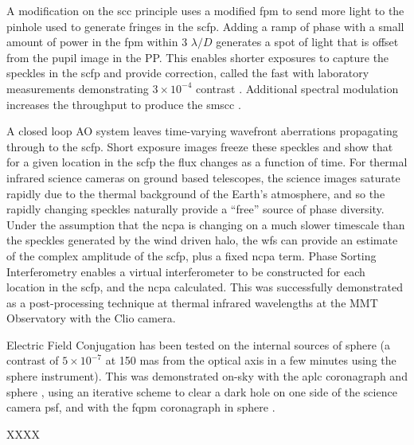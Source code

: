 \documentclass[letterpaper]{ar-1col}
\newcommand{\ld}{$\lambda/D$}
\begin{document}
A modification on the \ac{scc} principle uses a modified \ac{fpm} to send more light to the pinhole used to generate fringes in the \ac{scfp}.
%
Adding a ramp of phase with a small amount of power in the \ac{fpm} within 3 \ld{} generates a spot of light that is offset from the pupil image in the PP.
%
This enables shorter exposures to capture the speckles in the \ac{scfp} and provide correction, called the \acl{fast} \citep[\acs{fast}; ][]{Gerard18} with laboratory measurements demonstrating $3\times 10^{-4}$ contrast \citep{Gerard22}.
%
Additional spectral modulation increases the throughput to produce the \acl{smscc} \citep[\acs{smscc}; ][]{Haffert22a}.

\begin{armarginnote}[]
\end{armarginnote}

A closed loop AO system leaves time-varying wavefront aberrations propagating through to the \ac{scfp}.
%
Short exposure images freeze these speckles and show that for a given location in the \ac{scfp} the flux changes as a function of time.
%
For thermal infrared science cameras on ground based telescopes, the science images saturate rapidly due to the thermal background of the Earth's atmosphere, and so the rapidly changing speckles naturally provide a ``free'' source of phase diversity.
%
Under the assumption that the \ac{ncpa} is changing on a much slower timescale than the speckles generated by the wind driven halo, the \ac{wfs} can provide an estimate of the complex amplitude of the \ac{scfp}, plus a fixed \ac{ncpa} term.
%
Phase Sorting Interferometry \citep[PSI; ][]{Codona13} enables a virtual interferometer to be constructed for each location in the \ac{scfp}, and the \ac{ncpa} calculated.
%
This was successfully demonstrated as a post-processing technique at thermal infrared wavelengths at the MMT Observatory with the Clio camera.

Electric Field Conjugation has been tested on the internal sources of \ac{sphere} (a contrast of $5\times 10^{-7}$ at 150 mas from the optical axis in a few minutes using the \ac{sphere} instrument).
%
This was demonstrated on-sky with the \ac{aplc} coronagraph and \ac{sphere} \citep{Potier20,Potier22}, using an iterative scheme to clear a dark hole on one side of the science camera \ac{psf}, and with the \ac{fqpm} coronagraph in \ac{sphere} \citep{Galicher24}.

XXXX
\end{document}
